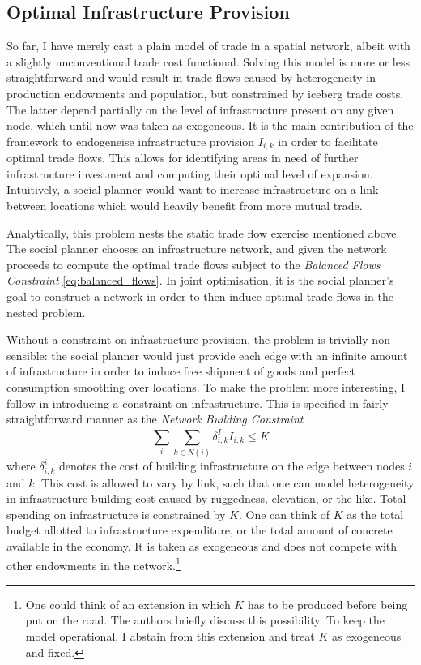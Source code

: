 \documentclass[11pt, oneside]{article}   	%
\begin{document}
\subsection{Optimal Infrastructure Provision}
So far, I have merely cast a plain model of trade in a spatial network, albeit with a slightly unconventional trade cost functional. Solving this model is more or less straightforward and would result in trade flows caused by heterogeneity in production endowments and population, but constrained by iceberg trade costs. The latter depend partially on the level of infrastructure present on any given node, which until now was taken as exogeneous. It is the main contribution of the \cite{fajgelbaum_optimal_2017} framework to endogeneise infrastructure provision $I_{i,k}$ in order to facilitate optimal trade flows. This allows for identifying areas in need of further infrastructure investment and computing their optimal level of expansion. Intuitively, a social planner would want to increase infrastructure on a link between locations which would heavily benefit from more mutual trade.

Analytically, this problem nests the static trade flow exercise mentioned above. The social planner chooses an infrastructure network, and given the network proceeds to compute the optimal trade flows subject to the \emph{Balanced Flows Constraint} \eqref{eq:balanced_flows}. In joint optimisation, it is the social planner's goal to construct a network in order to then induce optimal trade flows in the nested problem.

Without a constraint on infrastructure provision, the problem is trivially non-sensible: the social planner would just provide each edge with an infinite amount of infrastructure in order to induce free shipment of goods and perfect consumption smoothing over locations. To make the problem more interesting, I follow \citeauthor{fajgelbaum_optimal_2017} in introducing a constraint on infrastructure. This is specified in fairly straightforward manner as the \emph{Network Building Constraint}
\begin{equation}
  \sum_{i}^{}\sum_{k\in N(i)}^{}\delta^{I}_{i,k}I_{i,k} \leq K
  \label{eq:network_building}
\end{equation}
where $\delta^{i}_{i,k}$ denotes the cost of building infrastructure on the edge between nodes $i$ and $k$. This cost is allowed to vary by link, such that one can model heterogeneity in infrastructure building cost caused by ruggedness, elevation, or the like. Total spending on infrastructure is constrained by $K$. One can think of $K$ as the total budget allotted to infrastructure expenditure, or the total amount of concrete available in the economy. It is taken as exogeneous and does not compete with other endowments in the network.\footnote{One could think of an extension in which $K$ has to be produced before being put on the road. The authors briefly discuss this possibility. To keep the model operational, I abstain from this extension and treat $K$ as exogeneous and fixed.}
\end{document}
